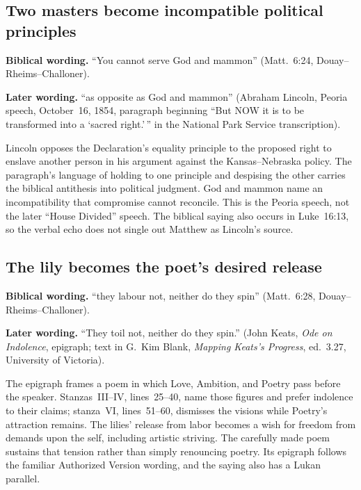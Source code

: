 \subsection*{Two masters become incompatible political principles\enspace{}}

\textbf{Biblical wording.} ``You cannot serve God and mammon''
(Matt.~6:24, Douay--Rheims--Challoner).

\textbf{Later wording.} ``as opposite as God and mammon'' (Abraham Lincoln,
Peoria speech, October~16, 1854, paragraph beginning ``But NOW it is to be
transformed into a `sacred right.'\,'' in the National Park Service
transcription).

Lincoln opposes the Declaration's equality principle to the proposed right
to enslave another person in his argument against the Kansas--Nebraska
policy. The paragraph's language of holding to one principle and despising
the other carries the biblical antithesis into political judgment. God and
mammon name an incompatibility that compromise cannot reconcile. This is
the Peoria speech, not the later ``House Divided'' speech. The biblical
saying also occurs in Luke~16:13, so the verbal echo does not single out
Matthew as Lincoln's source.

\subsection*{The lily becomes the poet's desired release\enspace{}}

\textbf{Biblical wording.} ``they labour not, neither do they spin''
(Matt.~6:28, Douay--Rheims--Challoner).

\textbf{Later wording.} ``They toil not, neither do they spin.'' (John Keats,
\emph{Ode on Indolence}, epigraph; text in G.~Kim Blank, \emph{Mapping Keats's
Progress}, ed.~3.27, University of Victoria).

The epigraph frames a poem in which Love, Ambition, and Poetry pass before
the speaker. Stanzas~III--IV, lines~25--40, name those figures and prefer
indolence to their claims; stanza~VI, lines~51--60, dismisses the visions while
Poetry's attraction remains. The lilies' release from labor becomes a wish
for freedom from demands upon the self, including artistic striving. The
carefully made poem sustains that tension rather than simply renouncing
poetry. Its epigraph follows the familiar Authorized Version wording,
and the saying also has a Lukan parallel.

